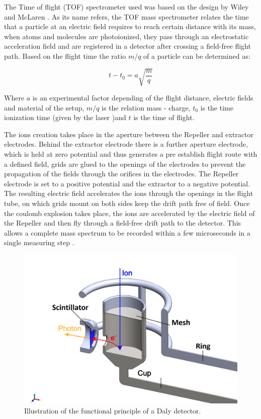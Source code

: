 The Time of flight (TOF) spectrometer used was based on the design by Wiley and McLaren \cite{wiley_timeflight_1955}. As its name refers, the TOF mass spectrometer relates the time that a particle at an electric field requires to reach certain distance with its mass, when atoms and molecules are photoionized,  they pass through an electrostatic acceleration field and are registered in a detector after crossing a field-free flight path. Based on the flight time the ratio $m/q$ of a particle can be determined as:

\begin{equation}
t-t_{0}=a\sqrt{\frac{m}{q}}
\end{equation}

Where $a$ is an experimental factor depending of the flight distance, electric fields and material of the setup,  $m/q$ is the relation mass - charge, $t_{0}$ is the time ionization time (given by the laser )and $t$ is the time of flight.

The ions creation takes place in the aperture between the Repeller and extractor electrodes. Behind the extractor electrode there is a further aperture electrode, which is held at zero potential and thus generates a pre establish flight route with a defined field, grids are glued to the openings of the electrodes to prevent the propagation of the fields through the orifices in the electrodes. The Repeller electrode is set to a positive potential and the extractor to a negative potential. The resulting electric field accelerates the ions through the openings in the flight tube, on which grids mount on both sides keep the drift path free of field.
Once the coulomb explosion takes place, the ions are accelerated by the electric field of the Repeller and then fly through a field-free drift path to the detector. This allows a complete mass spectrum to be recorded within a few microseconds in a single measuring step \cite{mobius_time--flight_2016}.

\begin{figure}[hbtp]
\label{img:tofcup}
\centering
\includegraphics[width = 10 cm]{../Images/Cup scintillator.png}
\caption[TOF cup]{Illustration of the functional principle of a Daly detector.}
\end{figure}


